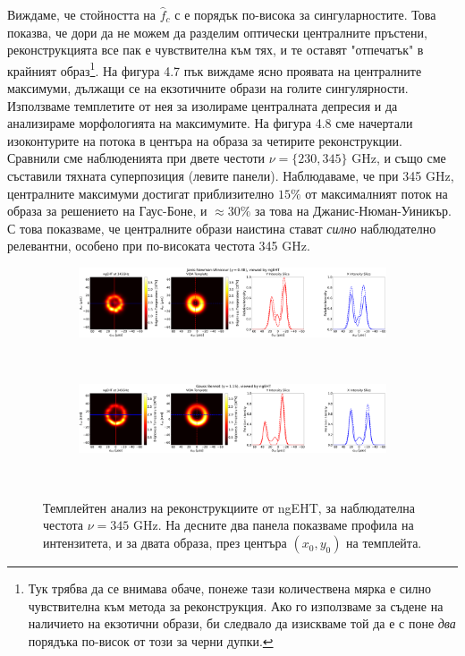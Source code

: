 \documentclass[12pt]{article}
\numberwithin{equation}{section}
\numberwithin{figure}{section}
\begin{document}
	 \newpage
	Виждаме, че стойността на $\hat{f}_c$ с е порядък по-висока за сингуларностите. Това показва, че дори да не можем да разделим оптически централните пръстени, реконструкцията все пак е чувствителна към тях, и те оставят "отпечатък" в крайният образ\footnote{Тук трябва да се внимава обаче, понеже тази количествена мярка е силно чувствителна към метода за реконструкция. Ако го използваме за съдене на наличието на екзотични образи, би следвало да изискваме той да е с поне \emph{два} порядъка по-висок от този за черни дупки.}. На фигура 4.7 пък виждаме ясно проявата на централните максимуми, дължащи се на екзотичните образи на голите сингулярности. Използваме темплетите от нея за изолираме централната депресия и да анализираме морфологията на максимумите. На фигура 4.8 сме начертали изоконтурите на потока в центъра на образа за четирите реконструкции. Сравнили сме наблюденията при двете честоти $\nu = \{230, 345\}$ GHz, и също сме съставили тяхната суперпозиция (левите панели). Наблюдаваме, че при 345 GHz, централните максимуми достигат приблизително $15\%$ от максималният поток на образа за решението на Гаус-Боне, и $\approx 30\%$ за това на Джанис-Нюман-Уиникър. С това показваме, че централните образи наистина стават \emph{силно} наблюдателно релевантни, особено при по-високата честота 345 GHz. 
	 
	 \begin{figure}[h!]
	 	\centering
	 	\begin{subfigure}{12cm}
	 		\hspace{-1.5cm}
	 		\includegraphics[scale = 0.13]{Section_8_Observing_Horizonless_Objects/Ehtim_Vida_plot_ngEHT_345_JNW.png}
	 	\end{subfigure}\\
	 	\begin{subfigure}{12cm}
	 		\hspace{-1.5cm}
	 		\includegraphics[scale = 0.13]{Section_8_Observing_Horizonless_Objects/Ehtim_Vida_plot_ngEHT_345_GB.png}
	 	\end{subfigure}\\
	 	\label{VIDA_ngEHT_230}
	 	\caption[Темплейтен анализ на реконструкциите от ngEHT за $\nu= 345$ GHz]{\small Темплейтен анализ на реконструкциите от ngEHT, за наблюдателна честота $\nu = 345$ GHz. На десните два панела показваме профила на интензитета, и за двата образа, през центъра $(x_0,y_0)$ на темплейта.} 
	 \end{figure}
	 
\end{document}
